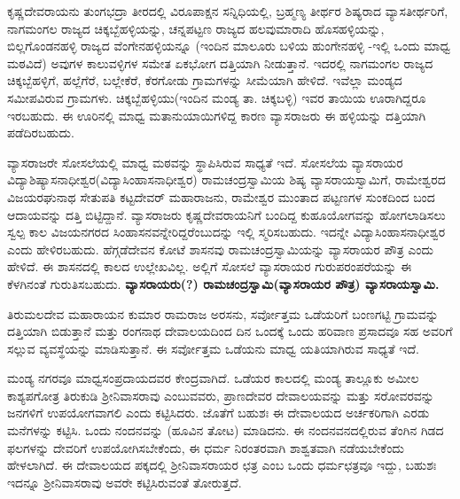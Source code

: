 ಕೃಷ್ಣದೇವರಾಯನು ತುಂಗಭದ್ರಾ ತೀರದಲ್ಲಿ ವಿರೂಪಾಕ್ಷನ ಸನ್ನಿಧಿಯಲ್ಲಿ, ಬ್ರಹ್ಮಣ್ಯ ತೀರ್ಥರ ಶಿಷ್ಯರಾದ ವ್ಯಾಸತೀರ್ಥ\-ರಿಗೆ, ನಾಗಮಂಗಲ ರಾಜ್ಯದ ಚಿಕ್ಕಬ್ಬೆಹಳ್ಳಿಯನ್ನು, ಚನ್ನಪಟ್ಟಣ ರಾಜ್ಯದ ಹಲವುಮಾರಾದಿ ಹೊಸಹಳ್ಳಿಯನ್ನು, ಬಿಲ್ಲಗೊಂಡನಹಳ್ಳಿ ರಾಜ್ಯದ ವೆಂಗೇನಹಳ್ಳಿಯನ್ನೂ (ಇಂದಿನ ಮಾಲೂರು ಬಳಿಯ ಹುಂಗೇನಹಳ್ಳಿ -ಇಲ್ಲಿ ಒಂದು ಮಾಧ್ವ ಮಠವಿದೆ) ಅವುಗಳ ಕಾಲುವಳ್ಳಿಗಳ ಸಮೇತ ಏಕಭೋಗ ದತ್ತಿಯಾಗಿ ನೀಡುತ್ತಾನೆ. ಇದರಲ್ಲಿ ನಾಗಮಂಗಲ ರಾಜ್ಯದ ಚಿಕ್ಕಬ್ಬೆಹಳ್ಳಿಗೆ, ಹಲ್ಲೆಗೆರೆ, ಬಲ್ಲೇಕೆರೆ, ಕೆರಗೋಡು ಗ್ರಾಮಗಳನ್ನು ಸೀಮೆಯಾಗಿ ಹೇಳಿದೆ. ಇವೆಲ್ಲಾ ಮಂಡ್ಯದ ಸಮೀಪವಿರುವ ಗ್ರಾಮಗಳು. ಚಿಕ್ಕಬ್ಬೆ\-ಹಳ್ಳಿಯು(ಇಂದಿನ ಮಂಡ್ಯ ತಾ. ಚಿಕ್ಕಬಳ್ಳಿ) ಇವರ ತಾಯಿಯ ಊರಾಗಿದ್ದರೂ ಇರಬಹುದು. ಈ ಊರಿನಲ್ಲಿ ಮಾಧ್ವ ಮತಾನುಯಾಯಿಗಳಿದ್ದ ಕಾರಣ ವ್ಯಾಸರಾಜರು ಈ ಹಳ್ಳಿಯನ್ನು ದತ್ತಿಯಾಗಿ ಪಡೆದಿರಬಹುದು.

ವ್ಯಾಸರಾಜರೇ ಸೋಸಲೆಯಲ್ಲಿ ಮಾಧ್ವ ಮಠವನ್ನು ಸ್ಥಾಪಿಸಿರುವ ಸಾಧ್ಯತೆ ಇದೆ. ಸೋಸಲೆಯ ವ್ಯಾಸರಾಯರ ವಿದ್ಯಾಶಿಷ್ಯಾಸನಾಧೀಶ್ವರ(ವಿದ್ಯಾಸಿಂಹಾಸನಾಧೀಶ್ವರ) ರಾಮಚಂದ್ರಸ್ವಾಮಿಯ ಶಿಷ್ಯ ವ್ಯಾಸರಾಯಸ್ವಾಮಿಗೆ, ರಾಮೇಶ್ವರದ ವಿಜಯರಘುನಾಥ ಸೇತುಪತಿ ಕಟ್ಟದೇವರ್​ ಮಹಾರಾಜನು, ರಾಮೇಶ್ವರ ಮುಂತಾದ ಪಟ್ಟಣಗಳ ಸುಂಕದಿಂದ ಬಂದ ಆದಾಯವನ್ನು ದತ್ತಿ ಬಿಟ್ಟಿದ್ದಾನೆ. ವ್ಯಾಸರಾಜರು ಕೃಷ್ಣದೇವರಾಯನಿಗೆ ಬಂದಿದ್ದ ಕುಹೂಯೋಗವನ್ನು ಹೋಗಲಾಡಿಸಲು ಸ್ವಲ್ಪ ಕಾಲ ವಿಜಯನಗರದ ಸಿಂಹಾಸನವನ್ನೇರಿದ್ದರೆಂಬುದನ್ನು ಇಲ್ಲಿ ಸ್ಮರಿಸಬಹುದು. ಇದನ್ನೇ ವಿದ್ಯಾಸಿಂಹಾಸನಾಧೀಶ್ವರ ಎಂದು ಹೇಳಿರಬಹುದು. ಹೆಗ್ಗಡೆದೇವನ ಕೋಟೆ ಶಾಸನವು ರಾಮಚಂದ್ರಸ್ವಾಮಿಯನ್ನು ವ್ಯಾಸರಾಯರ ಪೌತ್ರ ಎಂದು ಹೇಳಿದೆ. ಈ ಶಾಸನದಲ್ಲಿ ಕಾಲದ ಉಲ್ಲೇಖವಿಲ್ಲ. ಅಲ್ಲಿಗೆ ಸೋಸಲೆ ವ್ಯಾಸರಾಯರ ಗುರುಪರಂಪರೆಯನ್ನು ಈ ಕೆಳಗಿನಂತೆ ಗುರುತಿಸಬಹುದು. \textbf{ವ್ಯಾಸರಾಯರು(?) ರಾಮಚಂದ್ರಸ್ವಾಮಿ(ವ್ಯಾಸರಾಯರ ಪೌತ್ರ)  ವ್ಯಾಸರಾಯಸ್ವಾಮಿ.}

ತಿರುಮಲದೇವ ಮಹಾರಾಯನ ಕುಮಾರ ರಾಮರಾಜ ಅರಸನು, ಸರ್ವೋತ್ತಮ ಒಡೆಯರಿಗೆ ಬಂಣಗಟ್ಟಿ ಗ್ರಾಮವನ್ನು ದತ್ತಿಯಾಗಿ ಬಿಡುತ್ತಾನೆ ಮತ್ತು ರಂಗನಾಥ ದೇವಾಲಯದಿಂದ ದಿನ ಒಂದಕ್ಕೆ ಒಂದು ಹರಿವಾಣ ಪ್ರಸಾದವೂ ಸಹ ಅವರಿಗೆ ಸಲ್ಲುವ ವ್ಯವಸ್ಥೆಯನ್ನು ಮಾಡಿಸುತ್ತಾನೆ. ಈ ಸರ್ವೋತ್ತಮ ಒಡೆಯನು ಮಾಧ್ವ ಯತಿಯಾಗಿರುವ ಸಾಧ್ಯತೆ ಇದೆ.

ಮಂಡ್ಯ ನಗರವೂ ಮಾಧ್ವಸಂಪ್ರದಾಯದವರ ಕೇಂದ್ರವಾಗಿದೆ. ಒಡೆಯರ ಕಾಲದಲ್ಲಿ ಮಂಡ್ಯ ತಾಲ್ಲೂಕು ಅಮೀಲ ಕಾಶ್ಯಪಗೋತ್ರ ತಿರುಕುಡಿ ಶ‍್ರೀನಿವಾಸರಾವು ಎಂಬುವವರು, ಪ್ರಾಣದೇವರ ದೇವಾಲಯವನ್ನು ಮತ್ತು ಸರೋವರವನ್ನು ಜನಗಳಿಗೆ ಉಪಯೋಗವಾಗಲಿ ಎಂದು ಕಟ್ಟಿಸಿದರು. ಜೊತೆಗೆ ಬಹುಶಃ ಈ ದೇವಾಲಯದ ಅರ್ಚಕರಿಗಾಗಿ ಎರಡು ಮನೆಗಳನ್ನು ಕಟ್ಟಿಸಿ. ಒಂದು ನಂದನವನ್ನು (ಹೂವಿನ ತೋಟ) ಮಾಡಿದನು. ಈ ನಂದನವನದಲ್ಲಿರುವ ತೆಂಗಿನ ಗಿಡದ ಫಲಗಳನ್ನು ದೇವರಿಗೆ ಉಪಯೋಗಿಸಬೇಕೆಂದು, ಈ ಧರ್ಮ ನಿರಂತರವಾಗಿ ಶಾಶ್ವತವಾಗಿ ನಡೆಯಬೇಕೆಂದು ಹೇಳಲಾಗಿದೆ. ಈ ದೇವಾಲಯದ ಪಕ್ಕದಲ್ಲಿ ಶ‍್ರೀನಿವಾಸರಾಯರ ಛತ್ರ ಎಂಬ ಒಂದು ಧರ್ಮಛತ್ರವೂ ಇದ್ದು, ಬಹುಶಃ ಇದನ್ನೂ ಶ‍್ರೀನಿವಾಸರಾವು ಅವರೇ ಕಟ್ಟಿಸಿರುವಂತೆ ತೋರುತ್ತದೆ.


